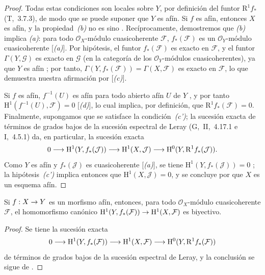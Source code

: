 \documentclass[oneside,10pt]{amsart}
\makeatletter
\newcommand{\ega@arrow}[2]{\mathchoice{#1}{#2}{#2}{#2}}
\renewcommand{\to}{\ega@arrow{\longrightarrow}{\rightarrow}}
\newcommand{\oldpage}[2][]{\marginnote{\normalfont\footnotesize\textbf{#1}~|~#2}\ignorespaces}
\let\EGAOriginalLabel\label
\renewcommand{\label}[1]{\phantomsection\EGAOriginalLabel{#1}}
\makeatother
\begin{document}
\begin{proof}
Todas estas condiciones son locales sobre $Y$, por definición del funtor $\mathrm{R}^1f_*$ (T,~3.7.3), de modo que se puede suponer que $Y$ es afín.
Si $f$ es afín, entonces $X$ es afín, y la propiedad~\emph{(b)} no es sino .
Recíprocamente, demostremos que \emph{(b)} implica \emph{(a)}:
para todo $\mathcal{O}_X$-módulo cuasicoherente $\mathcal{F}$, $f_*(\mathcal{F})$ es un $\mathcal{O}_Y$-módulo cuasicoherente [\emph{(a)}].
Por hipótesis, el funtor $f_*(\mathcal{F})$ es exacto en $\mathcal{F}$, y el funtor $\Gamma(Y,\mathcal{G})$ es exacto en $\mathcal{G}$ (en la categoría de los $\mathcal{O}_Y$-módulos cuasicoherentes), ya que $Y$ es afín ;
por tanto, $\Gamma(Y,f_*(\mathcal{F}))=\Gamma(X,\mathcal{F})$ es exacto en $\mathcal{F}$, lo que demuestra nuestra afirmación por [\emph{(c)}].

Si $f$ es afín, $f^{-1}(U)$ es afín para todo abierto afín $U$ de $Y$ , y por tanto $\mathrm{H}^1(f^{-1}(U),\mathcal{F})=0$ [\emph{(d)}], lo cual implica, por definición, que $\mathrm{R}^1f_*(\mathcal{F})=0$.
Finalmente, supongamos que se satisface la condición~\emph{(c')};
la sucesión exacta de términos de grados bajos de la sucesión espectral de Leray (G,~II,~4.17.1 e I,~4.5.1) da, en particular, la sucesión exacta
\[
  0\to\mathrm{H}^1(Y,f_*(\mathcal{J}))\to
  \mathrm{H}^1(X,\mathcal{J})\to
  \mathrm{H}^0(Y,\mathrm{R}^1f_*(\mathcal{J})).
\]
Como $Y$ es afín y $f_*(\mathcal{J})$ es cuasicoherente [\emph{(a)}], se tiene $\mathrm{H}^1(Y,f_*(\mathcal{J}))=0$ ;
la hipótesis~\emph{(c')} implica entonces que $\mathrm{H}^1(X,\mathcal{J})=0$, y se concluye por  que $X$ es un esquema afín.
\end{proof}

\begin{corollary}[5.2.3]
\label{II.5.2.3-fr}
Si $f:X\to Y$ es un morfismo afín, entonces, para todo $\mathcal{O}_X$-módulo cuasicoherente $\mathcal{F}$, el homomorfismo canónico $\mathrm{H}^1(Y,f_*(\mathcal{F}))\to\mathrm{H}^1(X,\mathcal{F})$ es biyectivo.
\end{corollary}

\oldpage[II]{99}
\begin{proof}
Se tiene la sucesión exacta
\[
  0\to\mathrm{H}^1(Y,f_*(\mathcal{F}))\to
  \mathrm{H}^1(X,\mathcal{F})\to
  \mathrm{H}^0(Y,\mathrm{R}^1f_*(\mathcal{F}))
\]
de términos de grados bajos de la sucesión espectral de Leray, y la conclusión se sigue de .
\end{proof}
\end{document}
